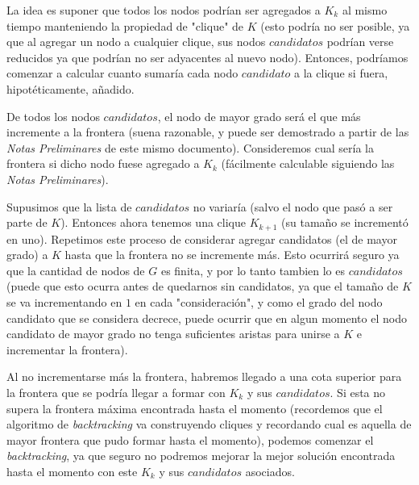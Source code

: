 \begin{description}
        \par La idea es suponer que todos los nodos podr\'ian ser agregados a $K_k$
            al mismo tiempo manteniendo la propiedad de "clique" de $K$ (esto podr\'ia
            no ser posible, ya que al agregar un nodo a cualquier clique, sus nodos
            $candidatos$ podr\'ian verse reducidos ya que podr\'ian no ser adyacentes
            al nuevo nodo). Entonces, podr\'iamos comenzar a calcular cuanto sumar\'ia
            cada nodo $candidato$ a la clique si fuera, hipot\'eticamente, a\~nadido.

        \par De todos los nodos $candidatos$, el nodo de mayor grado ser\'a el que m\'as
            incremente a la frontera (suena razonable, y puede ser demostrado a partir
            de las \emph{Notas Preliminares} de este mismo documento). Consideremos
            cual ser\'ia la frontera si dicho nodo fuese agregado a $K_k$ (f\'acilmente
            calculable siguiendo las \emph{Notas Preliminares}).

        \par Supusimos que la lista de $candidatos$ no variar\'ia (salvo el nodo que
            pas\'o a ser parte de $K$). Entonces ahora tenemos una clique $K_{k+1}$
            (su tama\~no se increment\'o en uno). Repetimos este proceso de considerar
            agregar candidatos (el de mayor grado) a $K$ hasta que la frontera no se
            incremente m\'as. Esto ocurrir\'a seguro ya que la cantidad de nodos de $G$
            es finita, y por lo tanto tambien lo es $candidatos$ (puede que esto ocurra
            antes de quedarnos sin candidatos, ya que el tama\~no de $K$ se va incrementando
            en $1$ en cada "consideraci\'on", y como el grado del nodo candidato que se
            considera decrece, puede ocurrir que en algun momento el nodo candidato de
            mayor grado no tenga suficientes aristas para unirse a $K$ e incrementar
            la frontera).

        \par Al no incrementarse m\'as la frontera, habremos llegado a una cota superior
            para la frontera que se podr\'ia llegar a formar con $K_k$ y sus $candidatos$.
            Si esta no supera la frontera m\'axima encontrada hasta el momento (recordemos
            que el algoritmo de \emph{backtracking} va construyendo cliques y recordando
            cual es aquella de mayor frontera que pudo formar hasta el momento), podemos
            comenzar el \emph{backtracking}, ya que seguro no podremos mejorar la mejor
            soluci\'on encontrada hasta el momento con este $K_k$ y sus $candidatos$
            asociados.


\end{description}

